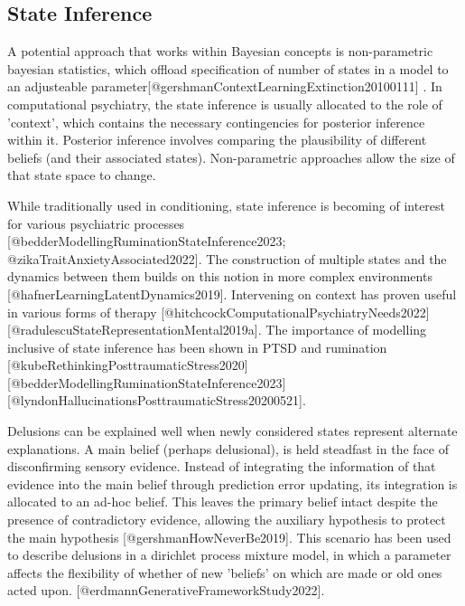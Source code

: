 \documentclass{article}
\begin{document}
\subsection{State Inference}

A potential approach that works within Bayesian concepts is non-parametric bayesian statistics, which offload specification of number of states in a model to an adjusteable parameter[@gershmanContextLearningExtinction20100111] . In computational psychiatry, the state inference is usually allocated to the role of 'context', which contains the necessary contingencies for posterior inference within it. Posterior inference involves comparing the plausibility of different beliefs (and their associated states). Non-parametric approaches allow the size of that state space to change.

While traditionally used in conditioning, state inference is becoming of interest for various psychiatric processes [@bedderModellingRuminationStateInference2023; @zikaTraitAnxietyAssociated2022]. The construction of multiple states and the dynamics between them builds on this notion in more complex environments [@hafnerLearningLatentDynamics2019]. Intervening on context has proven useful in various forms of therapy [@hitchcockComputationalPsychiatryNeeds2022] [@radulescuStateRepresentationMental2019a]. The importance of modelling inclusive of state inference has been shown in PTSD and rumination [@kubeRethinkingPosttraumaticStress2020] [@bedderModellingRuminationStateInference2023] [@lyndonHallucinationsPosttraumaticStress20200521].

Delusions can be explained well when newly considered states represent alternate explanations. A main belief (perhaps delusional), is held steadfast in the face of disconfirming sensory evidence. Instead of integrating the information of that evidence into the main belief through prediction error updating, its integration is allocated to an ad-hoc belief. This leaves the primary belief intact despite the presence of contradictory evidence, allowing the auxiliary hypothesis to protect the main hypothesis [@gershmanHowNeverBe2019]. This scenario has been used to describe delusions in a dirichlet process mixture model, in which a parameter affects the flexibility of whether of new 'beliefs' on which are made or old ones acted upon. [@erdmannGenerativeFrameworkStudy2022].
\end{document}
